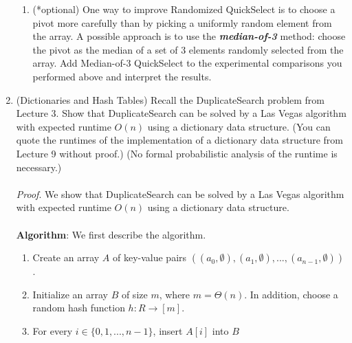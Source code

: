 \documentclass[11pt]{article}
\begin{document}
\begin{enumerate}
\begin{enumerate}
        \item (*optional)  One way to improve Randomized QuickSelect is to choose a pivot more carefully than by picking a uniformly random element from the array. A possible approach is to use the \textit{\textbf{median-of-3}} method: choose the pivot as the median of a set of 3 elements randomly selected from the array. Add Median-of-3 QuickSelect to the experimental comparisons you performed above and interpret the results.

    \end{enumerate}


    \item (Dictionaries and Hash Tables) 
    Recall the DuplicateSearch problem from Lecture 3. Show that DuplicateSearch can be solved by a Las Vegas algorithm with expected runtime $O(n)$ using a dictionary data structure.  (You can quote the runtimes of the implementation of a dictionary data structure from Lecture 9 without proof.) (No formal probabilistic analysis of the runtime is necessary.)
    \\\\
    \textit{Proof}. We show that DuplicateSearch can be solved by a Las Vegas algorithm with expected runtime $O(n)$ using a dictionary data structure.
    \\\\
    \textbf{Algorithm}: We first describe the algorithm.
    \begin{enumerate}
        \item Create an array $A$ of key-value pairs $((a_0,\emptyset), (a_1,\emptyset),...,(a_{n-1},\emptyset))$.
        \item Initialize an array $B$ of size $m$, where $m=\Theta(n)$. In addition, choose a random hash function $h : R \to [m]$.
        \item For every $i\in \{0,1,...,n-1\}$, insert $A[i]$ into $B$ 
    \end{enumerate}


\end{enumerate}
\end{document}

